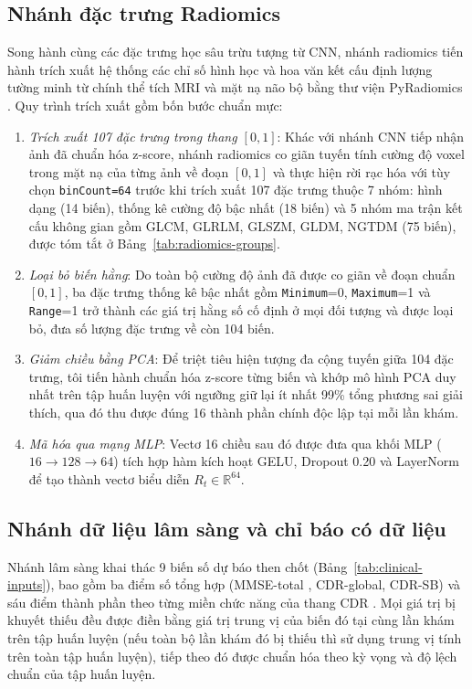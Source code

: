 \subsection{Nhánh đặc trưng Radiomics}
\label{sec:radiomics-pipeline}
Song hành cùng các đặc trưng học sâu trừu tượng từ CNN, nhánh radiomics tiến hành trích xuất hệ thống các chỉ số hình học và hoa văn kết cấu định lượng tường minh từ chính thể tích MRI và mặt nạ não bộ bằng thư viện PyRadiomics \cite{vangriethuysen2017computational}. Quy trình trích xuất gồm bốn bước chuẩn mực:
\begin{enumerate}
\item \emph{Trích xuất 107 đặc trưng trong thang $[0,1]$}: Khác với nhánh CNN tiếp nhận ảnh đã chuẩn hóa z-score, nhánh radiomics co giãn tuyến tính cường độ voxel trong mặt nạ của từng ảnh về đoạn $[0,1]$ và thực hiện rời rạc hóa với tùy chọn \texttt{binCount=64} \cite{pyradiomicsbins} trước khi trích xuất 107 đặc trưng thuộc 7 nhóm: hình dạng (14 biến), thống kê cường độ bậc nhất (18 biến) và 5 nhóm ma trận kết cấu không gian gồm GLCM, GLRLM, GLSZM, GLDM, NGTDM (75 biến), được tóm tắt ở Bảng~\ref{tab:radiomics-groups}.
\item \emph{Loại bỏ biến hằng}: Do toàn bộ cường độ ảnh đã được co giãn về đoạn chuẩn $[0,1]$, ba đặc trưng thống kê bậc nhất gồm \texttt{Minimum}=0, \texttt{Maximum}=1 và \texttt{Range}=1 trở thành các giá trị hằng số cố định ở mọi đối tượng và được loại bỏ, đưa số lượng đặc trưng về còn 104 biến.
\item \emph{Giảm chiều bằng PCA}: Để triệt tiêu hiện tượng đa cộng tuyến giữa 104 đặc trưng, tôi tiến hành chuẩn hóa z-score từng biến và khớp mô hình PCA \cite{jolliffe2016pca} duy nhất trên tập huấn luyện với ngưỡng giữ lại ít nhất 99\% tổng phương sai giải thích, qua đó thu được đúng 16 thành phần chính độc lập tại mỗi lần khám.
\item \emph{Mã hóa qua mạng MLP}: Vectơ 16 chiều sau đó được đưa qua khối MLP ($16\to128\to64$) tích hợp hàm kích hoạt GELU, Dropout 0.20 và LayerNorm để tạo thành vectơ biểu diễn $R_t\in\mathbb R^{64}$.
\end{enumerate}



\subsection{Nhánh dữ liệu lâm sàng và chỉ báo có dữ liệu}
Nhánh lâm sàng khai thác 9 biến số dự báo then chốt (Bảng~\ref{tab:clinical-inputs}), bao gồm ba điểm số tổng hợp (MMSE-total \cite{folstein1975mmse}, CDR-global, CDR-SB) và sáu điểm thành phần theo từng miền chức năng của thang CDR \cite{morris1993cdr}. Mọi giá trị bị khuyết thiếu đều được điền bằng giá trị trung vị của biến đó tại cùng lần khám trên tập huấn luyện (nếu toàn bộ lần khám đó bị thiếu thì sử dụng trung vị tính trên toàn tập huấn luyện), tiếp theo đó được chuẩn hóa theo kỳ vọng và độ lệch chuẩn của tập huấn luyện.

